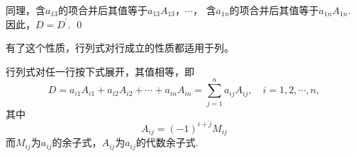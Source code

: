 \begin{frame}
    同理，含$a_{13}$的项合并后其值等于$a_{13}A_{13}$，$\cdots$，
    含$a_{1n}$的项合并后其值等于$a_{1n}A_{1n}$. 因此，$D=D^\prime$.  \qed

 

\end{frame}

\begin{frame}
\begin{zhu}
  有了这个性质，行列式对行成立的性质都适用于列。
\end{zhu}
\end{frame}

\begin{frame}
\begin{xingzhi}
  行列式对任一行按下式展开，其值相等，即
  $$
  D = a_{i1} A_{i1} + a_{i2} A_{i2} + \cdots + a_{in}A_{in} = \sum_{j=1}^n a_{ij} A_{ij}, \quad
  i = 1, 2, \cdots, n,
  $$
  其中
  $$
  A_{ij} = (-1)^{i+j} M_{ij}
  $$
  而$M_{ij}$为$a_{ij}$的余子式，$A_{ij}$为$a_{ij}$的代数余子式.
\end{xingzhi}
\end{frame}

